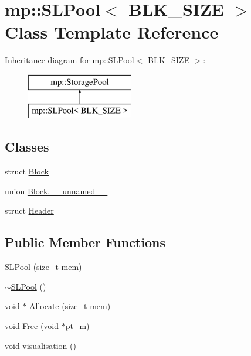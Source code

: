 \hypertarget{classmp_1_1_s_l_pool}{}\section{mp\+:\+:S\+L\+Pool$<$ B\+L\+K\+\_\+\+S\+I\+ZE $>$ Class Template Reference}
\label{classmp_1_1_s_l_pool}
Inheritance diagram for mp\+:\+:S\+L\+Pool$<$ B\+L\+K\+\_\+\+S\+I\+ZE $>$\+:\begin{figure}[H]
\begin{center}
\leavevmode
\includegraphics[height=2.000000cm]{classmp_1_1_s_l_pool}
\end{center}
\end{figure}
\subsection*{Classes}
\begin{DoxyCompactItemize}
\item 
struct \hyperlink{structmp_1_1_s_l_pool_1_1_block}{Block}
\item 
union \hyperlink{classmp_1_1_s_l_pool_unionmp_1_1_s_l_pool_1_1_block_8____unnamed____}{Block.\+\_\+\+\_\+unnamed\+\_\+\+\_\+}
\item 
struct \hyperlink{structmp_1_1_s_l_pool_1_1_header}{Header}
\end{DoxyCompactItemize}
\subsection*{Public Member Functions}
\begin{DoxyCompactItemize}
\item 
\hyperlink{classmp_1_1_s_l_pool_a9f1a91197f85fac54d0ed7f4f2d53b6e}{S\+L\+Pool} (size\+\_\+t mem)
\item 
\hyperlink{classmp_1_1_s_l_pool_ab1a395b720c1f1bc3d87b43346200695}{$\sim$\+S\+L\+Pool} ()
\item 
void $\ast$ \hyperlink{classmp_1_1_s_l_pool_a543f5c4b2d190bbfc89170a227dc92a8}{Allocate} (size\+\_\+t mem)
\item 
void \hyperlink{classmp_1_1_s_l_pool_a605b83d9042098aabaf19e3796222a74}{Free} (void $\ast$pt\+\_\+m)
\item 
void \hyperlink{classmp_1_1_s_l_pool_a6770602574612fd2ef47bf474c0797bc}{visualisation} ()
\end{DoxyCompactItemize}
